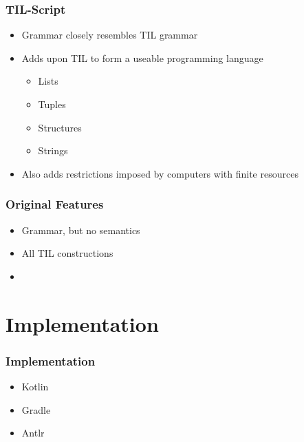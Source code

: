 \documentclass{beamer}
\begin{document}
\begin{frame}
    \frametitle{TIL-Script}
    \begin{itemize}
        \item Grammar closely resembles TIL grammar
        \item Adds upon TIL to form a useable programming language
            \begin{itemize}
                \item Lists
                \item Tuples
                \item Structures
                \item Strings
            \end{itemize}
        \item Also adds restrictions imposed by computers with finite resources
    \end{itemize}
\end{frame}

\begin{frame}
    \frametitle{Original Features}
    \begin{itemize}
        \item Grammar, but no semantics
        \item All TIL constructions
        \item 
    \end{itemize}
\end{frame}

\section{Implementation}

\begin{frame}
    \frametitle{Implementation}
    \begin{itemize}
        \item Kotlin
        \item Gradle
        \item Antlr
    \end{itemize}
\end{frame}
\end{document}

